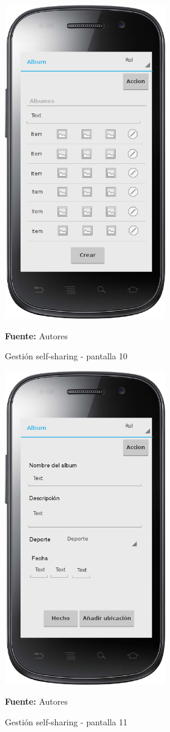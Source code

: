 \begin{figure}[!htb]
  \begin{center}
    \includegraphics[width=7cm]{./imagenes/UI/Self_sharing/self_sharing_10.png}
    \caption{Gestión self-sharing - pantalla 10}
    \label{fig:self_sharing_}
    \textbf{Fuente:}  Autores
  \end{center}
\end{figure}

\begin{figure}[!htb]
  \begin{center}
    \includegraphics[width=7cm]{./imagenes/UI/Self_sharing/self_sharing_11.png}
    \caption{Gestión self-sharing - pantalla 11}
    \label{fig:self_sharing_11}
    \textbf{Fuente:}  Autores
  \end{center}
\end{figure}

